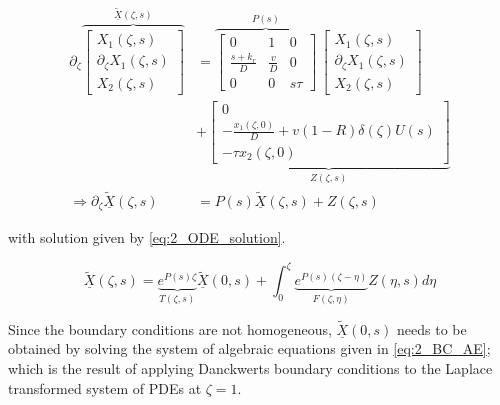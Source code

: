     \begin{equation} \label{eq:2_laplace_transformed}
    \begin{aligned}
        \partial_\zeta \overbrace{\begin{bmatrix}
            X_1(\zeta,s)\\ \partial_\zeta X_1(\zeta,s)\\ X_2(\zeta,s)
        \end{bmatrix}}^{\underline{\tilde{X}}(\zeta,s)} &= \overbrace{\begin{bmatrix}
            0 & 1 & 0\\
            \frac{s+k_r}{D} & \frac{v}{D} & 0\\
            0 & 0 & s\tau
            \end{bmatrix}}^{P(s)} \, \begin{bmatrix}
                X_1(\zeta,s)\\ \partial_\zeta X_1(\zeta,s)\\ X_2(\zeta,s)
            \end{bmatrix} \\
            &+ \underbrace{\begin{bmatrix}
                0\\ -\frac{x_1(\zeta,0)}{D} + v(1-R) \delta(\zeta) U(s)\\ -\tau x_2(\zeta,0)
            \end{bmatrix}}_{Z(\zeta,s)} \\
            \Rightarrow \partial_\zeta \underline{\tilde{X}}(\zeta,s) &= P(s) \underline{\tilde{X}}(\zeta,s) + Z(\zeta,s)
    \end{aligned}
    \end{equation} 
    
    with solution given by \eqref{eq:2_ODE_solution}.
    
    \begin{equation} \label{eq:2_ODE_solution}
        \underline{\tilde{X}}(\zeta,s) = \underbrace{e^{P(s)\zeta}}_{T(\zeta,s)} \underline{\tilde{X}}(0,s) + \int_0^\zeta \underbrace{e^{P(s)(\zeta - \eta)}}_{F(\zeta, \eta)} Z(\eta,s) d\eta
    \end{equation}
    
    Since the boundary conditions are not homogeneous, $\underline{\tilde{X}}(0,s)$ needs to be obtained by solving the system of algebraic equations given in \eqref{eq:2_BC_AE}; which is the result of applying Danckwerts boundary conditions to the Laplace transformed system of PDEs at $\zeta = 1$.
    
